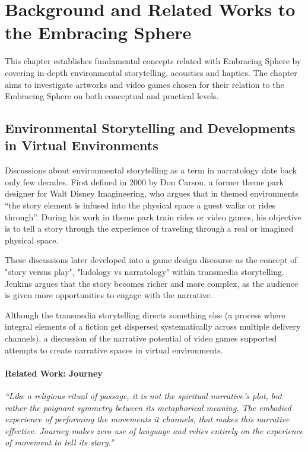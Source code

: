 \chapter{Background and Related Works to the Embracing Sphere}
    This chapter establishes fundamental concepts related with Embracing Sphere by covering in-depth environmental storytelling, acoustics and haptics. The chapter aims to investigate artworks and video games chosen for their relation to the Embracing Sphere on both conceptual and practical levels.\par
    \section{Environmental Storytelling and Developments in Virtual Environments}
        Discussions about environmental storytelling as a term in narratology date back only few decades. First defined in 2000 by Don Carson, a former theme park designer for Walt Disney Imagineering, who argues that in themed environments “the story element is infused into the physical space a guest walks or rides through”\cite{Liminal_Space_Between_Embedded_and_Emergent_Narrative}. During his work in theme park train rides or video games, his objective is to tell a story through the experience of traveling through a real or imagined physical space\cite{Lessons_Learned_from_the_Theme_Park_Industry}.\par

        These discussions later developed into a game design discourse as the concept of "story versus play", "ludology vs narratology\cite{Hamlet_on_the_Holodeck}" within transmedia storytelling\cite{Jenkins_Shall_We_Play}. Jenkins argues that the story becomes richer and more complex, as the audience is given more opportunities to engage with the narrative.\par

        Although the transmedia storytelling directs something else (a process where integral elements of a fiction get dispersed systematically across multiple delivery channels\cite{Jenkins_Transmedia}), a discussion of the narrative potential of video games supported attempts to create narrative spaces in virtual environments\cite{Liminal_Space_Between_Embedded_and_Emergent_Narrative}.\par

        \subsubsection{Related Work: Journey}
            \emph{“Like a religious ritual of passage, it is not the spiritual narrative’s plot, but rather the poignant symmetry between its metaphorical meaning. The embodied experience of performing the movements it channels, that makes this narrative effective. Journey makes zero use of language and relies entirely on the experience of movement to tell its story\cite{Game_Movement_as_Enactive_Focalization}\cite{Narrative_Geography}.”}\par

